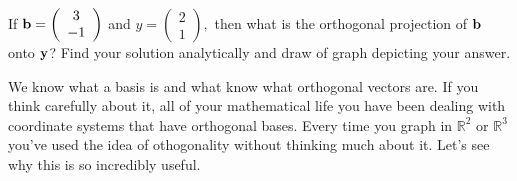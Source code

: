 \begin{problem}
    If ${\bf b} = \left( \begin{array}{c} 3 \\ -1  \end{array} \right)$ and $y = \left(
    \begin{array}{c} 2 \\ 1  \end{array} \right),$ then what is the orthogonal projection of ${\bf b}$
    onto ${\bf y}$?  Find your solution analytically and draw of graph depicting your answer.
% 
% 
\end{problem}
%             

We know what a basis is and what know what orthogonal vectors are.  If you think carefully
about it, all of your mathematical life you have been dealing with coordinate systems that have
orthogonal bases.  Every time you graph in $\mathbb{R}^2$ or $\mathbb{R}^3$ you've used
the idea of othogonality without thinking much about it.  Let's see why this is so
incredibly useful.

